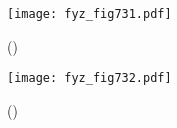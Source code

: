     \begin{figure}[ht!] %
      \centering
      \texttt{[image: fyz\_fig731.pdf]}
      \caption{
               (\cite[s.~707]{Feynman02})}
      \label{fyz_fig731}
    \end{figure}

    \begin{figure}[ht!] %
      \centering
      \texttt{[image: fyz\_fig732.pdf]}
      \caption{
               (\cite[s.~707]{Feynman02})}
      \label{fyz_fig732}
    \end{figure}


